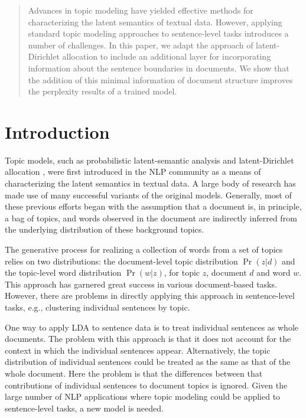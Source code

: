 \begin{abstract}

Advances in topic modeling have yielded effective methods for characterizing
the latent semantics of textual data.  However, applying standard topic
modeling approaches to sentence-level tasks introduces a number of challenges.
In this paper, we adapt the approach of latent-Dirichlet allocation to include
an additional layer for incorporating information about the sentence boundaries
in documents.  We show that the addition of this minimal information of
document structure improves the perplexity results of a trained model.  

\end{abstract}

\section{Introduction} \label{s:introduction}

Topic models, such as probabilistic latent-semantic analysis
\cite{hofmann1999probabilistic} and latent-Dirichlet allocation
\cite{blei2003latent}, were first introduced in the NLP community as a means of
characterizing the latent semantics in textual data.  A large body of
research has made use of many successful variants of the
original models.  Generally, most of these previous efforts began with the
assumption that a document is, in principle, a bag of topics, and words 
observed in the document are indirectly inferred from the underlying
distribution of these background topics.  

The generative process for realizing a collection of words from a set of topics
relies on two distributions: the document-level topic distribution $\Pr(z|d)$
and the topic-level word distribution $\Pr(w|z)$, for topic $z$, document $d$
and word $w$.   This approach has garnered great success in various
document-based tasks.  However, there are problems in directly applying this
approach in sentence-level tasks, e.g., clustering individual sentences by
topic.

One way to apply LDA to sentence data is to treat individual sentences as whole
documents.  The problem with this approach is that it does not account for the
context in which the individual sentences appear.  Alternatively, the topic
distribution of individual sentences could be treated as the same as that of
the whole document.  Here the problem is that the differences between that
contributions of individual sentences to document topics is ignored.  Given the
large number of NLP applications where topic modeling could be applied to
sentence-level tasks, a new model is needed.

